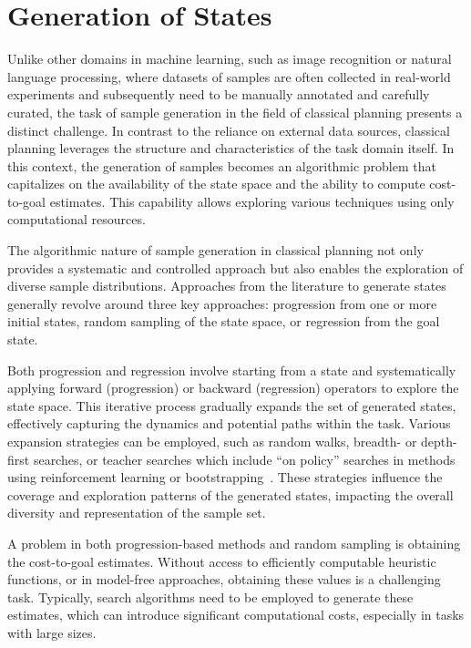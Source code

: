 \section{Generation of States}
\label{sec:generation}

Unlike other domains in machine learning, such as image recognition or natural language processing, where datasets of samples are often collected in real-world experiments and subsequently need to be manually annotated and carefully curated, the task of sample generation in the field of classical planning presents a distinct challenge. In contrast to the reliance on external data sources, classical planning leverages the structure and characteristics of the task domain itself. In this context, the generation of samples becomes an algorithmic problem that capitalizes on the availability of the state space and the ability to compute cost-to-goal estimates. This capability allows exploring various techniques using only computational resources.

The algorithmic nature of sample generation in classical planning not only provides a systematic and controlled approach but also enables the exploration of diverse sample distributions. Approaches from the literature to generate states generally revolve around three key approaches: progression from one or more initial states, random sampling of the state space, or regression from the goal state.

Both progression and regression involve starting from a state and systematically applying forward (progression) or backward (regression) operators to explore the state space. This iterative process gradually expands the set of generated states, effectively capturing the dynamics and potential paths within the task. Various expansion strategies can be employed, such as random walks, breadth- or depth-first searches, or teacher searches which include ``on policy'' searches in methods using reinforcement learning or bootstrapping~\cite{Arfaee.etal/2011}. These strategies influence the coverage and exploration patterns of the generated states, impacting the overall diversity and representation of the sample set.

A problem in both progression-based methods and random sampling is obtaining the cost-to-goal estimates. Without access to efficiently computable heuristic functions, or in model-free approaches, obtaining these values is a challenging task. Typically, search algorithms need to be employed to generate these estimates, which can introduce significant computational costs, especially in tasks with large sizes.

